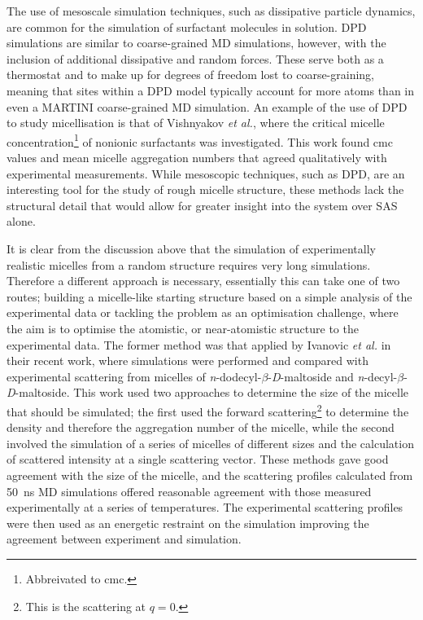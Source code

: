 The use of mesoscale simulation techniques, such as dissipative particle dynamics, are common for the simulation of surfactant molecules in solution.\autocite{shelley_computer_2000}
DPD simulations are similar to coarse-grained MD simulations, however, with the inclusion of additional dissipative and random forces.
These serve both as a thermostat and to make up for degrees of freedom lost to coarse-graining, meaning that sites within a DPD model typically account for more atoms than in even a MARTINI coarse-grained MD simulation.
An example of the use of DPD to study micellisation is that of Vishnyakov \emph{et al.},\autocite{vishnyakov_prediction_2013} where the critical micelle concentration\footnote{Abbreivated to cmc.} of nonionic surfactants was investigated.
This work found cmc values and mean micelle aggregation numbers that agreed qualitatively with experimental measurements.
While mesoscopic techniques, such as DPD, are an interesting tool for the study of rough micelle structure, these methods lack the structural detail that would allow for greater insight into the system over SAS alone.

It is clear from the discussion above that the simulation of experimentally realistic micelles from a random structure requires very long simulations.
Therefore a different approach is necessary, essentially this can take one of two routes; building a micelle-like starting structure based on a simple analysis of the experimental data or tackling the problem as an optimisation challenge, where the aim is to optimise the atomistic, or near-atomistic structure to the experimental data.
The former method was that applied by Ivanovic \emph{et al.} in their recent work,\autocite{ivanovic_temperature-dependent_2018} where simulations were performed and compared with experimental scattering from micelles of \emph{n}-dodecyl-$\beta$-\emph{D}-maltoside and \emph{n}-decyl-$\beta$-\emph{D}-maltoside.
This work used two approaches to determine the size of the micelle that should be simulated; the first used the forward scattering\footnote{This is the scattering at $q=0$.} to determine the density and therefore the aggregation number of the micelle,\autocite{lipfert_size_2007} while the second involved the simulation of a series of micelles of different sizes and the calculation of scattered intensity at a single scattering vector.
These methods gave good agreement with the size of the micelle, and the scattering profiles calculated from \SI{50}{\nano\second} MD simulations offered reasonable agreement with those measured experimentally at a series of temperatures.
The experimental scattering profiles were then used as an energetic restraint on the simulation improving the agreement between experiment and simulation.

